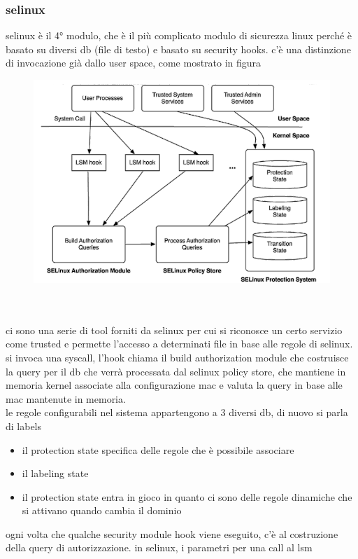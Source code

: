 \documentclass[12pt, oneside]{extbook} %
\begin{document}
\subsubsection{selinux}
selinux è il 4° modulo, che è il più complicato modulo di sicurezza linux perché è basato su diversi db (file di testo) e basato su security hooks. c'è una distinzione di invocazione già dallo user space, come mostrato in figura\\
\begin{figure}
	\includegraphics[scale=0.2]{immagini/selinux_schema.png}
\end{figure}\\\\
ci sono una serie di tool forniti da selinux per cui si riconosce un certo servizio come trusted e permette l'accesso a determinati file in base alle regole di selinux. si invoca una syscall, l'hook chiama il build authorization module che costruisce la query per il db che verrà processata dal selinux policy store, che mantiene in memoria kernel associate alla configurazione mac e valuta la query in base alle mac mantenute in memoria.\\le regole configurabili nel sistema appartengono a 3 diversi db, di nuovo si parla di labels
\begin{itemize}
\item il protection state specifica delle regole che  è possibile associare
\item il labeling state
\item il protection state entra in gioco in quanto ci sono delle regole dinamiche che si attivano quando cambia il dominio
\end{itemize}
ogni volta che qualche security module hook viene eseguito, c'è al costruzione della query di autorizzazione. in selinux, i parametri per una call al lsm
\end{document}
